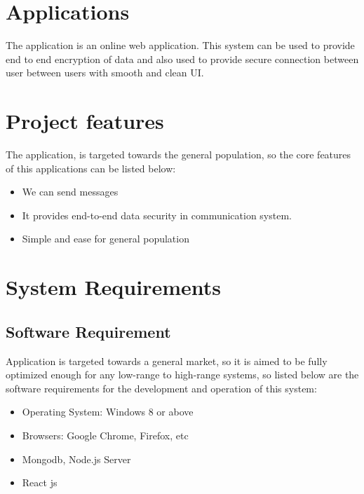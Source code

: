 \section{Applications}
The application is an online web application. This system can be used to provide end to end encryption of data and also used to provide secure connection between user between users with smooth and clean UI.

\section{Project features}
The application, is targeted towards the general population, so the core features of this applications can be listed below:

\vspace{-18pt}
\begin{itemize}
	\item We can send messages
	\item It provides end-to-end data security in communication system.
	\item Simple and ease for general population
\end{itemize}



\section{System Requirements}

\subsection{Software Requirement}
Application is targeted towards a general market,
so it is aimed to be fully optimized enough for any low-range to
high-range systems, so listed below are
the software requirements for the development and operation of this system:
\vspace{-18pt}
\begin{itemize}
	\item Operating System: Windows 8 or above
	\item Browsers: Google Chrome, Firefox, etc
	\item Mongodb, Node.js Server
	\item React js
\end{itemize}

